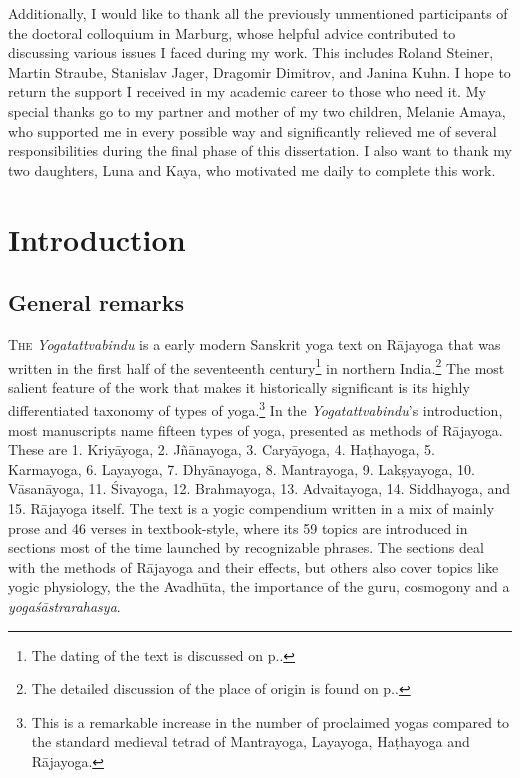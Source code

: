 Additionally, I would like to thank all the previously unmentioned participants of the doctoral colloquium in Marburg, whose helpful advice contributed to discussing various issues I faced during my work. This includes Roland Steiner, Martin Straube, Stanislav Jager, Dragomir Dimitrov, and Janina Kuhn. I hope to return the support I received in my academic career to those who need it.
My special thanks go to my partner and mother of my two children, Melanie Amaya, who supported me in every possible way and significantly relieved me of several responsibilities during the final phase of this dissertation. I also want to thank my two daughters, Luna and Kaya, who motivated me daily to complete this work.

\mainmatter
{}

\chapter{Introduction}
\cleardoublepage

\section{General remarks}
\label{generalremarks}
\lettrine[lines=2, lhang=0.2, loversize=0.25]{T}{he} \textit{Yogatattvabindu} is a early modern Sanskrit yoga text on Rājayoga that was written in the first half of the seventeenth century\footnote{The dating of the text is discussed on p.\pageref{dating}.} in northern India.\footnote{The detailed discussion of the place of origin is found on p.\pageref{placeoforigin}.} The most salient feature of the work that makes it historically significant is its highly differentiated taxonomy of types of yoga.\footnote{This is a remarkable increase in the number of proclaimed yogas compared to the standard medieval tetrad of Mantrayoga, Layayoga, Haṭhayoga and Rājayoga.} In the \textit{Yogatattvabindu}'s introduction, most manuscripts name fifteen types of yoga, presented as methods of Rājayoga. These are 1. Kriyāyoga, 2. Jñānayoga, 3. Caryāyoga, 4. Haṭhayoga, 5. Karmayoga, 6. Layayoga, 7. Dhyānayoga, 8. Mantrayoga, 9. Lakṣyayoga, 10. Vāsanāyoga, 11. Śivayoga, 12. Brahmayoga, 13. Advaitayoga, 14. Siddhayoga, and 15. Rājayoga itself. The text is a yogic compendium written in a mix of mainly prose and 46 verses in textbook-style, where its 59 topics are introduced in sections most of the time launched by recognizable phrases. The sections deal with the methods of Rājayoga and their effects, but others also cover topics like yogic physiology, the the Avadhūta, the importance of the guru, cosmogony and a \textit{yogaśāstrarahasya}.  

